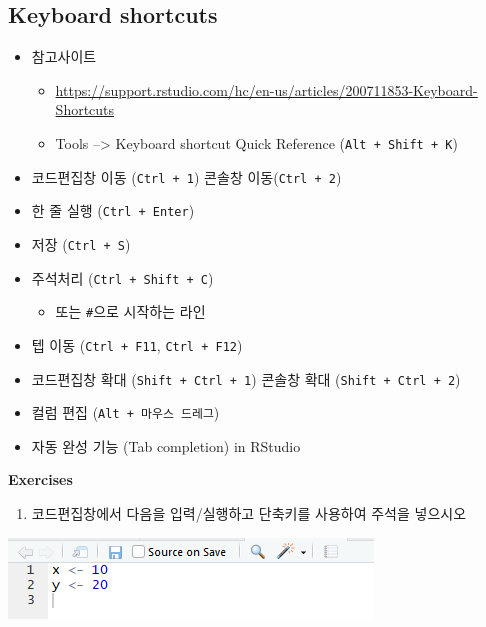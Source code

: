 \documentclass[
]{book}
\providecommand{\tightlist}{%
  \setlength{\itemsep}{0pt}\setlength{\parskip}{0pt}}
\begin{document}
\hypertarget{keyboard-shortcuts}{%
\subsection{Keyboard shortcuts}\label{keyboard-shortcuts}}

\begin{itemize}
\tightlist
\item
  참고사이트

  \begin{itemize}
  \tightlist
  \item
    \url{https://support.rstudio.com/hc/en-us/articles/200711853-Keyboard-Shortcuts}
  \item
    Tools --\textgreater{} Keyboard shortcut Quick Reference (\texttt{Alt\ +\ Shift\ +\ K})
  \end{itemize}
\item
  코드편집창 이동 (\texttt{Ctrl\ +\ 1}) 콘솔창 이동(\texttt{Ctrl\ +\ 2})
\item
  한 줄 실행 (\texttt{Ctrl\ +\ Enter})
\item
  저장 (\texttt{Ctrl\ +\ S})
\item
  주석처리 (\texttt{Ctrl\ +\ Shift\ +\ C})

  \begin{itemize}
  \tightlist
  \item
    또는 \texttt{\#}으로 시작하는 라인
  \end{itemize}
\item
  텝 이동 (\texttt{Ctrl\ +\ F11}, \texttt{Ctrl\ +\ F12})
\item
  코드편집창 확대 (\texttt{Shift\ +\ Ctrl\ +\ 1}) 콘솔창 확대 (\texttt{Shift\ +\ Ctrl\ +\ 2})
\item
  컬럼 편집 (\texttt{Alt\ +\ 마우스\ 드레그})
\item
  자동 완성 기능 (Tab completion) in RStudio
\end{itemize}

\textbf{Exercises}

\begin{enumerate}
\def\labelenumi{\arabic{enumi}.}
\tightlist
\item
  코드편집창에서 다음을 입력/실행하고 단축키를 사용하여 주석을 넣으시오
\end{enumerate}

\includegraphics{images/01/01-14.PNG}
\end{document}
